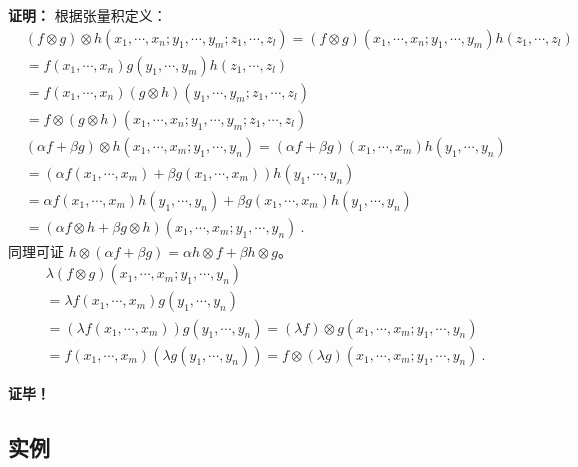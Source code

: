 \textbf{证明：}
根据张量积定义：
\begin{equation}
\begin{aligned}
&(f\otimes g)\otimes h(x_1,\cdots,x_n;y_1,\cdots,y_m;z_1,\cdots,z_l)=(f\otimes g)(x_1,\cdots,x_n;y_1,\cdots,y_m)h(z_1,\cdots,z_l)\\
&=f(x_1,\cdots,x_n)g(y_1,\cdots,y_m)h(z_1,\cdots,z_l)\\
&=f(x_1,\cdots,x_n)(g\otimes h)(y_1,\cdots,y_m;z_1,\cdots,z_l)\\
&=f\otimes(g\otimes h)(x_1,\cdots,x_n;y_1,\cdots,y_m;z_1,\cdots,z_l)
\end{aligned}
\end{equation}
\begin{equation}
\begin{aligned}
&(\alpha f+\beta g)\otimes h(x_1,\cdots,x_m;y_1,\cdots,y_n)=(\alpha f+\beta g)(x_1,\cdots,x_m)h(y_1,\cdots,y_n)\\
&=(\alpha f(x_1,\cdots,x_m)+\beta g(x_1,\cdots,x_m))h(y_1,\cdots,y_n)\\
&=\alpha f(x_1,\cdots,x_m)h(y_1,\cdots,y_n)+\beta g(x_1,\cdots,x_m)h(y_1,\cdots,y_n)\\
&=(\alpha f\otimes h+\beta g\otimes h)(x_1,\cdots,x_m;y_1,\cdots,y_n)~.
\end{aligned}
\end{equation}
同理可证 $h\otimes(\alpha f+\beta g)=\alpha h\otimes f+\beta h\otimes g$。
\begin{equation}
\begin{aligned}
&\lambda (f\otimes g)(x_1,\cdots,x_m;y_1,\cdots,y_n)\\
&=\lambda f(x_1,\cdots,x_m)g(y_1,\cdots,y_n)\\
&=(\lambda f(x_1,\cdots,x_m))g(y_1,\cdots,y_n)=(\lambda f)\otimes g(x_1,\cdots,x_m;y_1,\cdots,y_n)\\
&= f(x_1,\cdots,x_m)(\lambda g(y_1,\cdots,y_n))=f\otimes(\lambda g)(x_1,\cdots,x_m;y_1,\cdots,y_n)~.
\end{aligned}
\end{equation}

\textbf{证毕！}
\subsection{实例}

